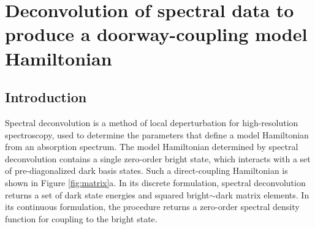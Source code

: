 % 








\chapter{Deconvolution of spectral data to produce a doorway-coupling
  model Hamiltonian}

\section{Introduction}

Spectral deconvolution is a method of local deperturbation for
high-resolution spectroscopy, used to determine the parameters that
define a model Hamiltonian from an absorption spectrum.  The model
Hamiltonian determined by spectral deconvolution contains a single
zero-order bright state, which interacts with a set of
pre-diagonalized dark basis states.  Such a direct-coupling
Hamiltonian is shown in Figure \ref{fig:matrix}a.  In its discrete
formulation, spectral deconvolution returns a set of dark state
energies and squared bright$\sim$dark matrix elements.  In its
continuous formulation, the procedure returns a zero-order spectral
density function for coupling to the bright state.

